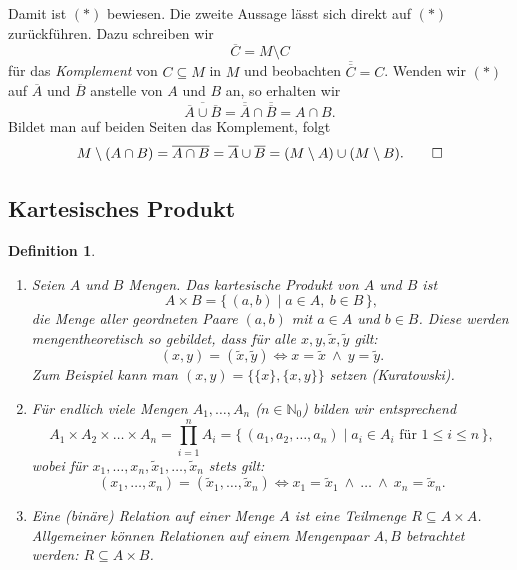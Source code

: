 \documentclass[a4paper]{article}
\makeatletter
\theoremstyle{kurzskript}
\newtheorem{definition}[satz]{Definition}
\renewenvironment{proof}[1][\proofname]{\par\pushQED{\qed}%
  \normalfont\topsep\medskipamount\relax
  \trivlist\item[\hskip\labelsep\bfseries #1\@addpunct{.}]\ignorespaces}%
  {\popQED\endtrivlist\@endpefalse}
\renewcommand{\proofname}{Beweis}
\newcommand{\N}{\mathbb{N}}
\makeatother
\begin{document}
\begin{proof}
Damit ist $(*)$ bewiesen. Die zweite Aussage lässt sich direkt auf $(*)$ zurückführen. Dazu schreiben wir
\[
  \overline{C} = M \setminus C
\]
für das \emph{Komplement} von $C \subseteq M$ in $M$ und beobachten $\overline{\overline{C}} = C$. Wenden wir $(*)$ auf $\overline{A}$ und $\overline{B}$ anstelle von $A$ und $B$ an, so erhalten wir
\[
  \overline{\overline{A} \cup \overline{B}} = \overline{\overline{A}} \cap \overline{\overline{B}} = A \cap B.
\]
Bildet man auf beiden Seiten das Komplement, folgt
\[
  M \setminus (A \cap B) = \overline{A \cap B} = \overline{A} \cup \overline{B} = (M \setminus A) \cup (M \setminus B). \qedhere
\]
\end{proof}

\subsection{Kartesisches Produkt}

\begin{definition}
\leavevmode
\begin{enumerate}[label=(\alph*)]
  \item Seien $A$ und $B$ Mengen. Das \emph{kartesische Produkt} von $A$ und $B$ ist
  \[
    A \times B = \{\, (a, b) \mid a \in A,\ b \in B \,\},
  \]
  die Menge aller \emph{geordneten Paare} $(a, b)$ mit $a \in A$ und $b \in B$. Diese werden mengentheoretisch so gebildet, dass für alle $x, y, \tilde{x}, \tilde{y}$ gilt:
  \[
    (x, y) = (\tilde{x}, \tilde{y}) \iff x = \tilde{x} \ \land\ y = \tilde{y}.
  \]
  Zum Beispiel kann man $(x, y) = \bigl\{ \{x\}, \{x, y\} \bigr\}$ setzen (Kuratowski).

  \item Für endlich viele Mengen $A_1, \dots, A_n$ ($n \in \N_0$) bilden wir entsprechend
  \[
    A_1 \times A_2 \times \dots \times A_n = \prod_{i=1}^{n} A_i = \{\, (a_1, a_2, \dots, a_n) \mid a_i \in A_i \text{ für } 1 \leq i \leq n \,\},
  \]
  wobei für $x_1, \dots, x_n, \tilde{x}_1, \dots, \tilde{x}_n$ stets gilt:
  \[
    (x_1, \dots, x_n) = (\tilde{x}_1, \dots, \tilde{x}_n) \iff x_1 = \tilde{x}_1 \ \land\ \dots\ \land\ x_n = \tilde{x}_n.
  \]

  \item Eine \emph{(binäre) Relation} auf einer Menge $A$ ist eine Teilmenge $R \subseteq A \times A$. Allgemeiner können Relationen auf einem Mengenpaar $A, B$ betrachtet werden: $R \subseteq A \times B$.
\end{enumerate}
\end{definition}
\end{document}
